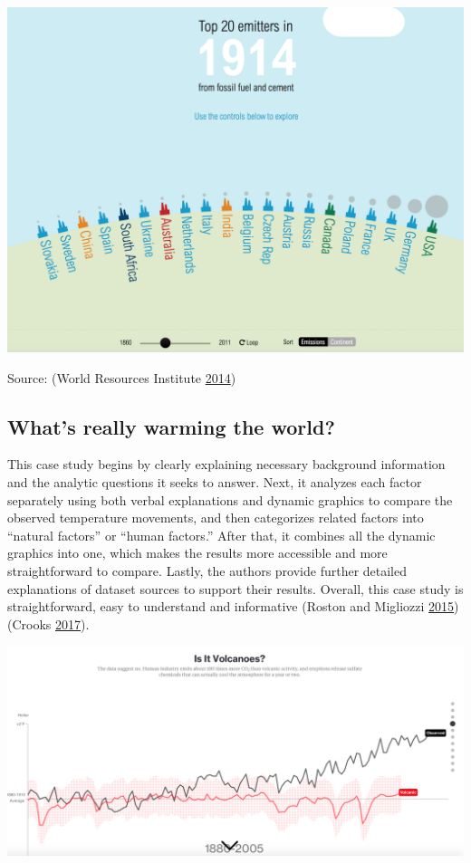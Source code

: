 \documentclass[]{book}
\begin{document}
\includegraphics{images/carbon_emissions.png}

Source: (World Resources Institute \protect\hyperlink{ref-CO2_emission}{2014})

\hypertarget{whats-really-warming-the-world}{%
\subsection{What's really warming the world?}\label{whats-really-warming-the-world}}

This case study begins by clearly explaining necessary background information and the analytic questions it seeks to answer. Next, it analyzes each factor separately using both verbal explanations and dynamic graphics to compare the observed temperature movements, and then categorizes related factors into ``natural factors'' or ``human factors.'' After that, it combines all the dynamic graphics into one, which makes the results more accessible and more straightforward to compare. Lastly, the authors provide further detailed explanations of dataset sources to support their results. Overall, this case study is straightforward, easy to understand and informative (Roston and Migliozzi \protect\hyperlink{ref-world_warming}{2015}) (Crooks \protect\hyperlink{ref-int_viz_capt}{2017}).

\includegraphics{images/volcano_global_warming.png}
\end{document}
